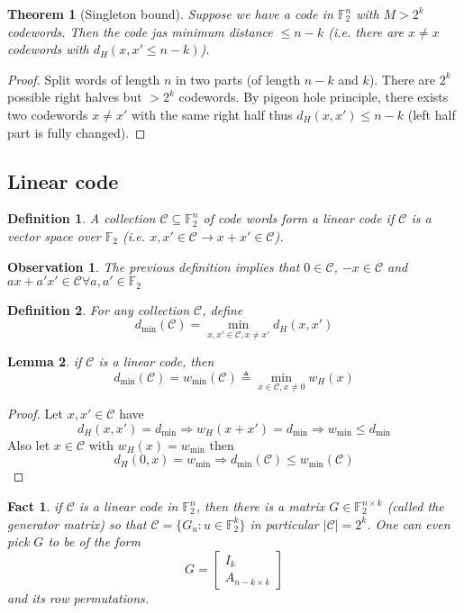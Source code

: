 \documentclass[twoside]{article}
\newtheorem{theorem}{Theorem}[section]
\newtheorem{fact}{Fact}[section]
\newtheorem{observation}{Observation}[section]
\newtheorem{lemma}[theorem]{Lemma}
\newtheorem{definition}{Definition}[section]
\theoremstyle{definition} %
\def\F{\mathbb{F}}
\def\C{\mathcal{C}}
\begin{document}
\begin{theorem}[Singleton bound]
  Suppose we have a code in $\F_2^n$ with $M > 2^k$ codewords. Then the code jas minimum distance $\leq n - k$ (i.e. there are $x\not = x$ codewords with $d_H(x,x' \leq n-k)$).
\end{theorem}

\begin{proof}
  Split words of length $n$ in two parts (of length $n-k$ and $k$). There are $2^k$ possible right halves but $> 2^k$ codewords. By pigeon hole principle, there exists two codewords $x\not = x'$ with the same right half thus $d_H(x,x') \leq n-k$ (left half part is fully changed).
\end{proof}


\subsection{Linear code}

\begin{definition}
  A collection $\C \subseteq \F_2^n$ of code words form a linear code if $\C$ is a vector space over $\F_2$ (i.e. $x,x' \in \C \to x+x' \in \C$).
\end{definition}

\begin{observation}
  The previous definition implies that $0 \in \C$, $-x \in \C$ and $ax +a'x' \in \C \forall a,a' \in \F_2$
\end{observation}

\begin{definition}
  For any collection $\C$, define
  \[
    d_{\min}(\C) = \min_{x,x'\in \C, x\not=x'} d_H(x,x')
  \]
\end{definition}

\begin{lemma}
  if $\C$ is a linear code, then
  \[
    d_{\min}(\C) = w_{\min}(\C) \triangleq \min_{x\in \C, x \not=0} w_H(x)
  \]
\end{lemma}

\begin{proof}
  Let $x, x'\in \C$ have
  \[
    d_H(x,x') = d_{\min} \Rightarrow w_H(x+x') = d_{\min} \Rightarrow w_{\min} \leq d_{\min}
  \]
  Also let $x\in \C$ with $w_H(x) = w_{\min}$ then
  \[
    d_H(0,x) = w_{\min} \Rightarrow d_{\min}(\C) \leq w_{\min}(\C)
  \]
\end{proof}


\begin{fact}
  if $\C$ is a linear code in $\F_2^n$, then there is a matrix $G\in \F_2^{n\times k}$ (called the generator matrix) so that $\C = \{G_u : u \in \F_2^k \}$ in particular $|\C| = 2^k$. One can even pick $G$ to be of the form
  \[
    G=\begin{bmatrix}
      I_k\\
      A_{n-k\times k}
    \end{bmatrix}
  \]
  and its row permutations.
\end{fact}
\end{document}
